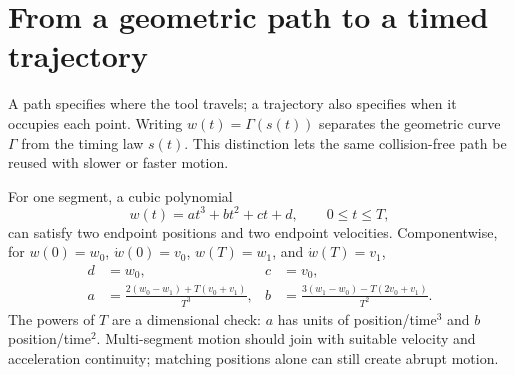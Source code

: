 \documentclass[11pt,a4paper]{article}
\begin{document}
\section{\enspace From a geometric path to a timed trajectory}
A path specifies where the tool travels; a trajectory also specifies when it occupies each point. Writing $w(t)=\Gamma(s(t))$ separates the geometric curve $\Gamma$ from the timing law $s(t)$. This distinction lets the same collision-free path be reused with slower or faster motion.

For one segment, a cubic polynomial
\[
 w(t)=at^3+bt^2+ct+d,\qquad 0\leq t\leq T,
\]
can satisfy two endpoint positions and two endpoint velocities. Componentwise, for $w(0)=w_0$, $\dot w(0)=v_0$, $w(T)=w_1$, and $\dot w(T)=v_1$,
\begin{align*}
 d&=w_0,&c&=v_0,\\
 a&=\frac{2(w_0-w_1)+T(v_0+v_1)}{T^3},&
 b&=\frac{3(w_1-w_0)-T(2v_0+v_1)}{T^2}.
\end{align*}
The powers of $T$ are a dimensional check: $a$ has units of position/time$^3$ and $b$ position/time$^2$. Multi-segment motion should join with suitable velocity and acceleration continuity; matching positions alone can still create abrupt motion.
\end{document}
